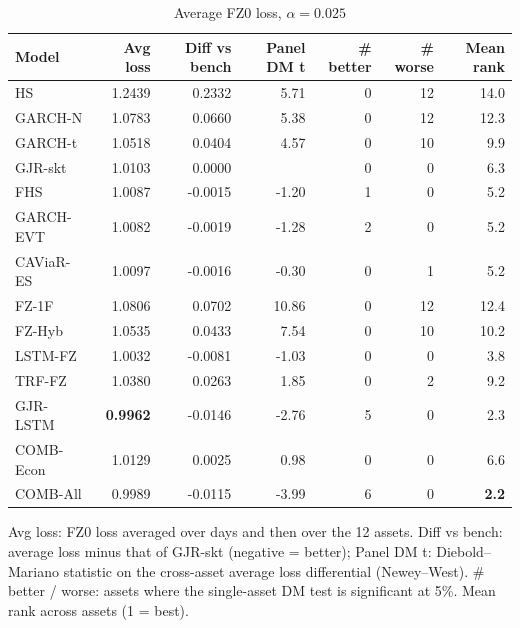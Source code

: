 \begin{table}[htbp]
\centering
\footnotesize
\caption{Average FZ0 loss, $\alpha=0.025$}
\label{tab:loss_a025}
\begin{tabular}{lrrrrrr}
\toprule
Model & Avg loss & Diff vs bench & Panel DM t & \# better & \# worse & Mean rank \\
\midrule
HS & 1.2439 & 0.2332 & 5.71 & 0 & 12 & 14.0 \\
GARCH-N & 1.0783 & 0.0660 & 5.38 & 0 & 12 & 12.3 \\
GARCH-t & 1.0518 & 0.0404 & 4.57 & 0 & 10 & 9.9 \\
GJR-skt & 1.0103 & 0.0000 &  & 0 & 0 & 6.3 \\
FHS & 1.0087 & -0.0015 & -1.20 & 1 & 0 & 5.2 \\
GARCH-EVT & 1.0082 & -0.0019 & -1.28 & 2 & 0 & 5.2 \\
CAViaR-ES & 1.0097 & -0.0016 & -0.30 & 0 & 1 & 5.2 \\
FZ-1F & 1.0806 & 0.0702 & 10.86 & 0 & 12 & 12.4 \\
FZ-Hyb & 1.0535 & 0.0433 & 7.54 & 0 & 10 & 10.2 \\
LSTM-FZ & 1.0032 & -0.0081 & -1.03 & 0 & 0 & 3.8 \\
TRF-FZ & 1.0380 & 0.0263 & 1.85 & 0 & 2 & 9.2 \\
GJR-LSTM & \textbf{0.9962} & -0.0146 & -2.76 & 5 & 0 & 2.3 \\
COMB-Econ & 1.0129 & 0.0025 & 0.98 & 0 & 0 & 6.6 \\
COMB-All & 0.9989 & -0.0115 & -3.99 & 6 & 0 & \textbf{2.2} \\
\bottomrule
\end{tabular}
\par\smallskip\parbox{\linewidth}{\scriptsize Avg loss: FZ0 loss averaged over days and then over the 12 assets. Diff vs bench: average loss minus that of GJR-skt (negative = better); Panel DM t: Diebold--Mariano statistic on the cross-asset average loss differential (Newey--West). \# better / worse: assets where the single-asset DM test is significant at 5\%. Mean rank across assets (1 = best).}
\end{table}